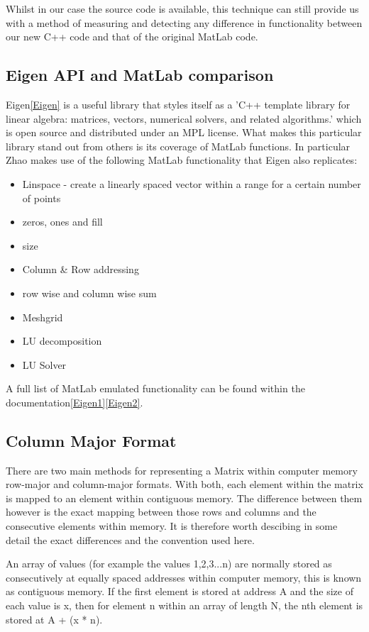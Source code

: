 \documentclass[a4paper]{amsart}
\begin{document}
Whilst in our case the source code is available, this technique can still provide us with a method of measuring and detecting any difference in functionality between our new C++ code and that of the original MatLab code.



\subsection{Eigen API and MatLab comparison}
Eigen\ref{Eigen} is a useful library that styles itself as a 'C++ template library for linear algebra: matrices, vectors, numerical solvers, and related algorithms.' which is open source and distributed under an MPL license. What makes this particular library stand out from others is its coverage of MatLab functions. In particular Zhao makes use of the following MatLab functionality that Eigen also replicates:

\begin{itemize}
\item Linspace - create a linearly spaced vector within a range for a certain number of points
\item zeros, ones and fill
\item size
\item Column \& Row addressing
\item row wise and column wise sum
\item Meshgrid
\item LU decomposition
\item LU Solver
\end{itemize}

A full list of MatLab emulated functionality can be found within the documentation\ref{Eigen1}\ref{Eigen2}.

\subsection{Column Major Format}\label{CMF}
There are two main methods for representing a Matrix within computer memory row-major and column-major formats. With both, each element within the matrix is mapped to an element within contiguous memory. The difference between them however is the exact mapping between those rows and columns and the consecutive elements within memory. It is therefore worth descibing in some detail the exact differences and the convention used here.

An array of values (for example the values 1,2,3...n) are normally stored as consecutively at equally spaced addresses within computer memory, this is known as contiguous memory. If the first element is stored at address A and the size of each value is x, then for element n within an array of length N, the nth element is stored at A + (x * n).
\end{document}
